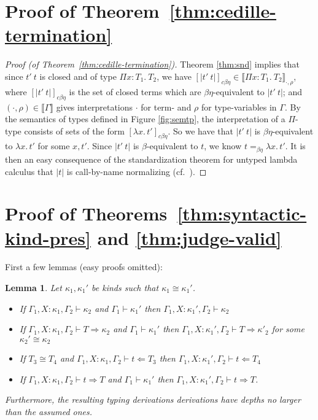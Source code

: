 \documentclass{article}
\newcommand{\interp}[1]{\llbracket #1 \rrbracket}
\newcommand{\tpcheck}[0]{\Leftarrow}
\newcommand{\tpsynth}[0]{\Rightarrow}
\newtheorem{lemma}[theorem]{Lemma}
\begin{document}
\section{Proof of Theorem~\ref{thm:cedille-termination}}
\begin{proof}[Proof (of Theorem~\ref{thm:cedille-termination})]
Theorem \ref{thm:snd} implies that since
$t'\ t$ is closed and of type $\Pi x:T_1.\ T_2$, we have
$[|t'\ t|]_{c\beta\eta}\in \interp{\Pi x:T_1.\ T_2}_{\cdot,\rho}$,
where $[|t'\ t|]_{c\beta\eta}$ is the set of closed terms which are
$\beta\eta$-equivalent to $|t'\ t|$; and
$(\cdot,\rho)\in\interp{\Gamma}$ gives interpretations $\cdot$ for
term- and $\rho$ for type-variables in $\Gamma$.  By the semantics of
types defined in Figure \ref{fig:semtp}, the
interpretation of a $\Pi$-type consists of sets of the form
$[\lambda x.\,t']_{c\beta\eta}$.  So we have that $|t'\ t|$ is $\beta\eta$-equivalent to
$\lambda x.\, t'$ for some $x, t'$.  
Since $|t'\ t|$ is $\beta$-equivalent to $t$, we know $t =_{\beta\eta} \lambda x.\, t'$.
It is then an easy consequence of the
standardization theorem for untyped lambda calculus that $|t|$ is
call-by-name normalizing (cf.~\cite{Kashima2000}).
\end{proof}

\section{Proof of Theorems~\ref{thm:syntactic-kind-pres} and \ref{thm:judge-valid}}
\label{sec:proof-syntactic-kind-pres}

First a few lemmas (easy proofs omitted):

\begin{lemma}
  \label{lem:ctxt-conv-class}
  Let \(\kappa_1,\kappa_1'\) be kinds such that \(\kappa_1 \cong \kappa_1'\).
  \begin{itemize}
  \item If \(\Gamma_1,X:\kappa_1,\Gamma_2 \vdash \kappa_2\) and \(\Gamma_1
    \vdash \kappa_1'\) then \(\Gamma_1,X:\kappa_1',\Gamma_2 \vdash \kappa_2\)
   
  \item If \(\Gamma_1,X:\kappa_1,\Gamma_2 \vdash T \tpsynth \kappa_2\) and
    \(\Gamma_1 \vdash \kappa_1'\) then \(\Gamma_1,X:\kappa_1',\Gamma_2 \vdash T
    \tpsynth \kappa'_2\) for some \(\kappa_2' \cong \kappa_2\)

    
  \item If \(T_3 \cong T_4\) and \(\Gamma_1,X:\kappa_1,\Gamma_2 \vdash t
    \tpcheck T_3\) then \(\Gamma_1,X:\kappa_1',\Gamma_2 \vdash t \tpcheck T_4\)
    
  \item If \(\Gamma_1,X:\kappa_1,\Gamma_2 \vdash t \tpsynth T\) and
    \(\Gamma_1 \vdash \kappa_1'\) then \(\Gamma_1,X:\kappa_1',\Gamma_2 \vdash t
    \tpsynth T\).
  \end{itemize}
  Furthermore, the resulting typing derivations derivations have depths no
  larger than the assumed ones.
\end{lemma}
\end{document}
